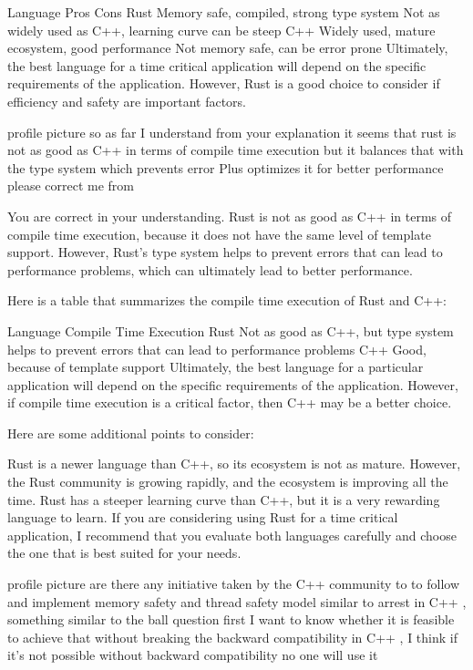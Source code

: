 \documentclass[11pt]{article}
\begin{document}
Language	Pros	Cons
Rust	Memory safe, compiled, strong type system	Not as widely used as C++, learning curve can be steep
C++	Widely used, mature ecosystem, good performance	Not memory safe, can be error prone
Ultimately, the best language for a time critical application will depend on the specific requirements of the application. However, Rust is a good choice to consider if efficiency and safety are important factors.

profile picture
so as far I understand from your explanation
it seems that rust
is not as good as C++ in terms of
compile time execution but
it
balances that with the type system
which prevents
error Plus
optimizes it for
better performance
please correct me from

You are correct in your understanding. Rust is not as good as C++ in terms of compile time execution, because it does not have the same level of template support. However, Rust's type system helps to prevent errors that can lead to performance problems, which can ultimately lead to better performance.

Here is a table that summarizes the compile time execution of Rust and C++:

Language	Compile Time Execution
Rust	Not as good as C++, but type system helps to prevent errors that can lead to performance problems
C++	Good, because of template support
Ultimately, the best language for a particular application will depend on the specific requirements of the application. However, if compile time execution is a critical factor, then C++ may be a better choice.

Here are some additional points to consider:

Rust is a newer language than C++, so its ecosystem is not as mature. However, the Rust community is growing rapidly, and the ecosystem is improving all the time.
Rust has a steeper learning curve than C++, but it is a very rewarding language to learn.
If you are considering using Rust for a time critical application, I recommend that you evaluate both languages carefully and choose the one that is best suited for your needs.

profile picture
are there any initiative taken by the C++ community
to
to follow and implement
memory safety
and thread safety
model
similar to
arrest
in C++
, something similar to the ball question
first I want to know whether it is feasible to achieve that
without
breaking the
backward compatibility
in C++
, I think if
it's not possible
without backward compatibility no one will
use it
\end{document}
